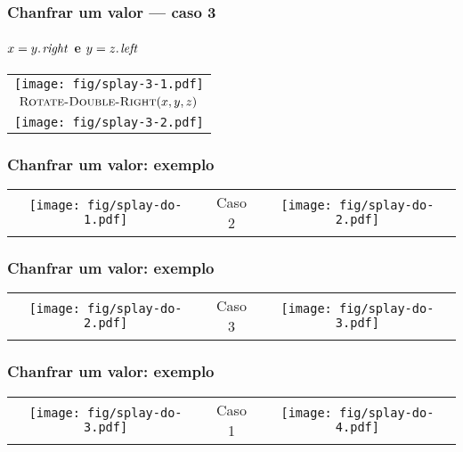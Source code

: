 \documentclass{beamer}
\begin{document}
\begin{frame}
\frametitle{Chanfrar um valor --- caso 3}
\framesubtitle{$x = \attrib{y}{right}$ e $y = \attrib{z}{left}$}

\begin{tabular}{c}
\texttt{[image: fig/splay-3-1.pdf]} \\
$\textnormal{\scshape Rotate-Double-Right}(x, y, z)$ \\
\texttt{[image: fig/splay-3-2.pdf]}
\end{tabular}

\end{frame}

\begin{frame}
\frametitle{Chanfrar um valor: exemplo}

\begin{tabular}[t]{ccc}
\texttt{[image: fig/splay-do-1.pdf]} &
Caso 2 &
\texttt{[image: fig/splay-do-2.pdf]}
\end{tabular}

\end{frame}

\begin{frame}
\frametitle{Chanfrar um valor: exemplo}

\begin{tabular}[t]{ccc}
\texttt{[image: fig/splay-do-2.pdf]} &
Caso 3 &
\texttt{[image: fig/splay-do-3.pdf]}
\end{tabular}

\end{frame}

\begin{frame}
\frametitle{Chanfrar um valor: exemplo}

\begin{tabular}[t]{ccc}
\texttt{[image: fig/splay-do-3.pdf]} &
Caso 1 &
\texttt{[image: fig/splay-do-4.pdf]}
\end{tabular}

\end{frame}
\end{document}
